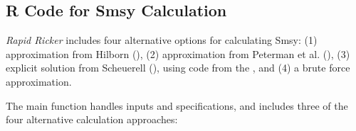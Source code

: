 \documentclass[french,11pt]{book}
\begin{document}
\subsection{R Code for Smsy Calculation}\label{BMFunsSmsy}

\emph{Rapid Ricker} includes four alternative options for calculating Smsy: (1) approximation from Hilborn (), (2) approximation from Peterman et al. (), (3) explicit solution from Scheuerell (), using code from the , and (4) a brute force approximation.

The main function handles inputs and specifications, and includes three of the four alternative calculation approaches:
\end{document}
